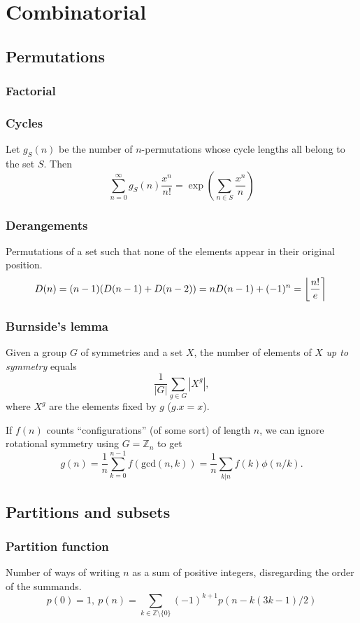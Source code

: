 \chapter{Combinatorial}

\section{Permutations}
	\subsection{Factorial}

	\subsection{Cycles}
		Let $g_S(n)$ be the number of $n$-permutations whose cycle lengths all belong to the set $S$. Then
		$$\sum_{n=0} ^\infty g_S(n) \frac{x^n}{n!} = \exp\left(\sum_{n\in S} \frac{x^n} {n} \right)$$

	\subsection{Derangements}
		Permutations of a set such that none of the elements appear in their original position.
		\[ \mkern-2mu D(n) = (n-1)(D(n-1)+D(n-2)) = n D(n-1)+(-1)^n = \left\lfloor\frac{n!}{e}\right\rceil \]

	\subsection{Burnside's lemma}
		Given a group $G$ of symmetries and a set $X$, the number of elements of $X$ \emph{up to symmetry} equals
		 \[ {\frac {1}{|G|}}\sum _{{g\in G}}|X^{g}|, \]
		 where $X^{g}$ are the elements fixed by $g$ ($g.x = x$).

		 If $f(n)$ counts ``configurations'' (of some sort) of length $n$, we can ignore rotational symmetry using $G = \mathbb Z_n$ to get
		 \[ g(n) = \frac 1 n \sum_{k=0}^{n-1}{f(\text{gcd}(n, k))} = \frac 1 n \sum_{k|n}{f(k)\phi(n/k)}. \]

\section{Partitions and subsets}
	\subsection{Partition function}
		Number of ways of writing $n$ as a sum of positive integers, disregarding the order of the summands.
		\[ p(0) = 1,\ p(n) = \sum_{k \in \mathbb Z \setminus \{0\}}{(-1)^{k+1} p(n - k(3k-1) / 2)} \]

